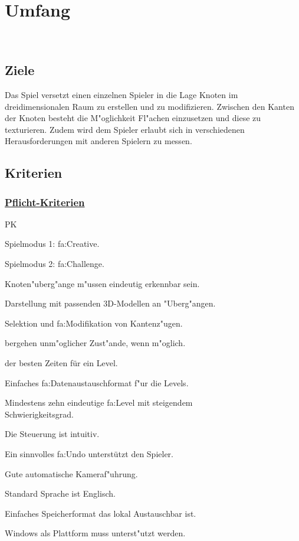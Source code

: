 %
%


\chapter{Umfang}
\label{UF}~\\


%
%
\section{Ziele}
\label{UF:Ziele}

Das Spiel versetzt einen einzelnen Spieler in die Lage Knoten im dreidimensionalen Raum zu erstellen und zu modifizieren. Zwischen den Kanten der Knoten besteht die M{"o}glichkeit Fl{"a}chen einzusetzen und diese zu texturieren. Zudem wird dem Spieler erlaubt sich in verschiedenen Herausforderungen mit anderen Spielern zu messen.\\


\section{Kriterien}
% 
%
\subsection*{\underline{Pflicht-Kriterien}}

\begin{ids}{\gls{PK}}


		\id[10] Spielmodus 1: \gls{fa:Creative}.
		
		\id[20] Spielmodus 2: \gls{fa:Challenge}.
		
		\id[30] Knoten{"u}berg{"a}nge m{"u}ssen eindeutig erkennbar sein.
		
		\id[40] Darstellung mit passenden 3D-Modellen an {"U}berg{"a}ngen.
		
		\id[50] Selektion und \gls{fa:Modifikation} von Kantenz{"u}gen.
		
		bergehen unm{"o}glicher Zust{"a}nde, wenn m{"o}glich.
		
		 der besten Zeiten für ein Level.
		
		\id[80] Einfaches \gls{fa:Datenaustauschformat} f{"u}r die Levels.
		
		\id[80] Mindestens zehn eindeutige \gls{fa:Level} mit steigendem \\Schwierigkeitsgrad.
		
		\id[90] Die Steuerung ist intuitiv.
		
		\id[100] Ein sinnvolles \gls{fa:Undo} unterstützt den Spieler.
		
		\id[110] Gute automatische Kameraf{"u}hrung.
		
		\id[120] Standard Sprache ist Englisch.
		
		\id[130] Einfaches Speicherformat das lokal Austauschbar ist.
		
		\id[140] Windows als Plattform muss unterst{"u}tzt werden.

\end{ids}

